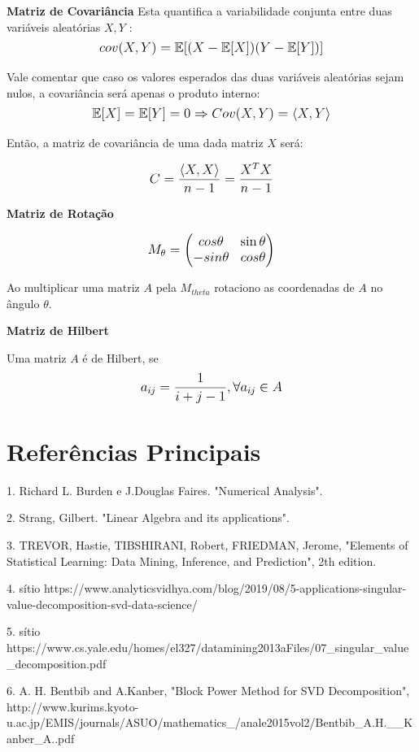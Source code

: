 \documentclass{article}
\begin{document}
\textbf{Matriz de Covariância}
Esta quantifica a variabilidade conjunta entre duas variáveis aleatórias $X, Y$ :
\begin{equation}
\mathlarger{
cov(X,Y) = \mathbb{E}[(X -  \mathbb{E}[X])(Y -  \mathbb{E}[Y])]
}
\end{equation}

Vale comentar que caso os valores esperados das duas variáveis aleatórias sejam nulos, a covariância será apenas o produto interno:
\begin{equation}
\mathlarger{
 \mathbb{E}[X] =  \mathbb{E}[Y] = 0 \Rightarrow Cov(X,Y) = \langle X, Y \rangle
}
\end{equation}

Então, a matriz de covariância de uma dada matriz $X$ será:

\begin{equation}
\mathlarger{
C = \frac{\langle X, X \rangle}{n-1} = \frac{ X^T X}{n-1} 
}
\end{equation}


\textbf{Matriz de Rotação}

\begin{equation}
\mathlarger{
M_{\theta} = \begin{pmatrix}
cos \theta & \sin \theta \\
- sin \theta & cos \theta
\end{pmatrix}
}
\end{equation}

Ao multiplicar uma matriz $A$ pela $M_{theta}$ rotaciono as coordenadas de $A$ no ângulo $\theta$.

\hfill


\textbf{Matriz de Hilbert}

Uma matriz $A$ é de Hilbert, se 
\begin{equation}
\mathlarger{
a_{ij} = \frac{1}{i+j-1}, \forall a_{ij} \in A
}
\end{equation}

\pagebreak

\section{Referências Principais}

\hfill

1. Richard L. Burden e J.Douglas Faires. "Numerical Analysis".

2. Strang, Gilbert. "Linear Algebra and its applications".

3. TREVOR, Hastie, TIBSHIRANI, Robert, FRIEDMAN, Jerome, "Elements of Statistical Learning: Data Mining, Inference, and Prediction", 2th edition.

4. sítio https://www.analyticsvidhya.com/blog/2019/08/5-applications-singular-value-decomposition-svd-data-science/

5. sítio https://www.cs.yale.edu/homes/el327/datamining2013aFiles/07_singular_value_decomposition.pdf

6. A. H. Bentbib and A.Kanber, "Block Power Method for SVD Decomposition", http://www.kurims.kyoto-u.ac.jp/EMIS/journals/ASUO/mathematics_/anale2015vol2/Bentbib_A.H.__Kanber_A..pdf
\end{document}
